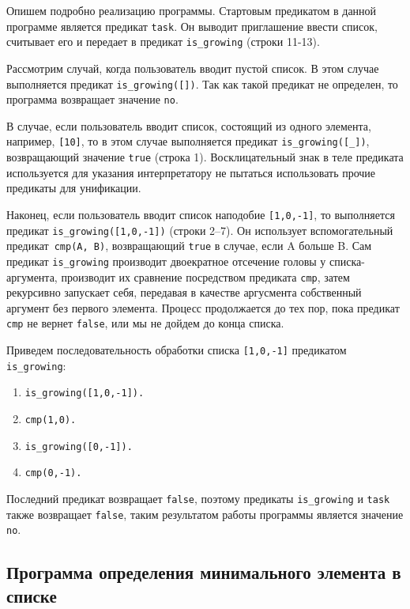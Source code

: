 Опишем подробно реализацию программы.
Стартовым предикатом в данной программе является предикат \texttt{task}.
Он выводит приглашение ввести список, считывает его и передает в предикат
\texttt{is\_growing} (строки 11-13).

Рассмотрим случай, когда пользователь вводит пустой список. 
В этом случае выполняется предикат \texttt{is\_growing([])}.
Так как такой предикат не определен, то программа возвращает значение \texttt{no}.

В случае, если пользователь вводит список, состоящий из одного элемента, 
например, \texttt{[10]}, то в этом случае выполняется предикат \texttt{is\_growing([\_])},
возвращающий значение \texttt{true} (строка 1). 
Восклицательный знак в теле предиката используется для указания
интерпретатору не пытаться использовать прочие предикаты для унификации.

Наконец, если пользователь вводит список наподобие \texttt{[1,0,-1]},
то выполняется предикат \texttt{is\_growing([1,0,-1])} (строки 2--7). 
Он использует вспомогательный предикат~\texttt{cmp(A, B)}, 
возвращающий \texttt{true} в случае, если A больше B.
Сам предикат \texttt{is\_growing} производит двоекратное отсечение головы
у списка-аргумента, производит их сравнение посредством предиката \texttt{cmp},
затем рекурсивно запускает себя, передавая в качестве аргусмента собственный
аргумент без первого элемента. 
Процесс продолжается до тех пор, пока предикат \texttt{cmp} не вернет \texttt{false},
или мы не дойдем до конца списка.

Приведем последовательность обработки списка \texttt{[1,0,-1]} предикатом \texttt{is\_growing}:

\begin{enumerate}
\item \texttt{is\_growing([1,0,-1]).}
\item \texttt{cmp(1,0).}
\item \texttt{is\_growing([0,-1]).}
\item \texttt{cmp(0,-1).}
\end{enumerate}

Последний предикат возвращает \texttt{false}, 
поэтому предикаты \texttt{is\_growing} и \texttt{task} также возвращает \texttt{false},
таким результатом работы программы является значение \texttt{no}.

\pagebreak

\subsection{Программа определения минимального элемента в списке}

